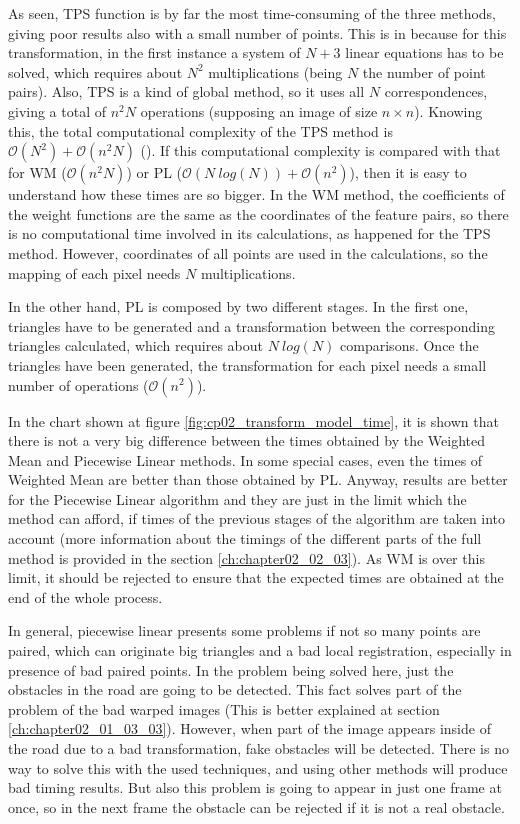 As seen, \ac{TPS} function is by far the most time-consuming of the three methods, giving poor results also with a small number of points. This is in because for this transformation, in the first instance a system of $N + 3$ linear equations has to be solved, which requires about $N^2$ multiplications (being $N$ the number of point pairs). Also, TPS is a kind of global method, so it uses all $N$ correspondences, giving a total of $n^2N$ operations (supposing an image of size $n \times n$). Knowing this, the total computational complexity of the TPS method is $\mathcal{O}(N^2) + \mathcal{O}(n^2N)$ (\cite{zagorchev2006comparative}). If this computational complexity is compared with that for \ac{WM} ($\mathcal{O}(n^2N)$) or \ac{PL} ($\mathcal{O}(N~log(N)) + \mathcal{O}(n^2)$), then it is easy to understand how these times are so bigger. In the \acf{WM} method, the coefficients of the weight functions are the same as the coordinates of the feature pairs, so there is no computational time involved in its calculations, as happened for the \ac{TPS} method. However, coordinates of all points are used in the calculations, so the mapping of each pixel needs $N$ multiplications.

In the other hand, \acf{PL} is composed by two different stages. In the first one, triangles have to be generated and a transformation between the corresponding triangles calculated, which requires about $N~log(N)$ comparisons. Once the triangles have been generated, the transformation for each pixel needs a small number of operations ($\mathcal{O}(n^2)$).

In the chart shown at figure \ref{fig:cp02_transform_model_time}, it is shown that there is not a very big difference between the times obtained by the Weighted Mean and Piecewise Linear methods. In some special cases, even the times of Weighted Mean are better than those obtained by \ac{PL}. Anyway, results are better for the Piecewise Linear algorithm and they are just in the limit which the method can afford, if times of the previous stages of the algorithm are taken into account (more information about the timings of the different parts of the full method is provided in the section \ref{ch:chapter02_02_03}). As \ac{WM} is over this limit, it should be rejected to ensure that the expected times are obtained at the end of the whole process.

In general, piecewise linear presents some problems if not so many points are paired, which can originate big triangles and a bad local registration, especially in presence of bad paired points. In the problem being solved here, just the obstacles in the road are going to be detected. This fact solves part of the problem of the bad warped images (This is better explained at section \ref{ch:chapter02_01_03_03}). However, when part of the image appears inside of the road due to a bad transformation, fake obstacles will be detected. There is no way to solve this with the used techniques, and using other methods will produce bad timing results. But also this problem is going to appear in just one frame at once, so in the next frame the obstacle can be rejected if it is not a real obstacle.

